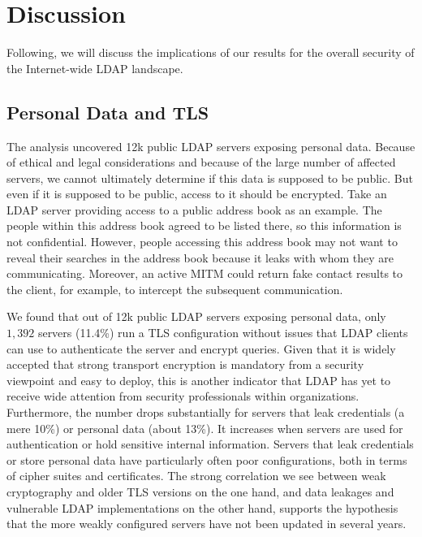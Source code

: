 \section{Discussion}
\label{sec:discussion}

Following, we will discuss the implications of our results for the overall security of the Internet-wide LDAP landscape.


\subsection{Personal Data and TLS}
The analysis uncovered 12k public LDAP servers exposing personal data. Because of ethical and legal considerations and because of the large number of affected servers, we cannot ultimately determine if this data is supposed to be public. But even if it is supposed to be public, access to it should be encrypted. Take an LDAP server providing access to a public address book as an example. The people within this address book agreed to be listed there, so this information is not confidential. However, people accessing this address book may not want to reveal their searches in the address book because it leaks with whom they are communicating. Moreover, an active \gls{MITM} could return fake contact results to the client, for example, to intercept the subsequent communication. 

We found that out of 12k public LDAP servers exposing personal data, only $1,392$ servers (11.4\%) run a TLS configuration without issues that LDAP clients can use to authenticate the server and encrypt queries. Given that it is widely accepted that strong transport encryption is mandatory from a security viewpoint and easy to deploy, this is another indicator that LDAP has yet to receive wide attention from security professionals within organizations. Furthermore, the number drops substantially for servers that leak credentials (a mere 10\%) or personal data (about 13\%). It increases when servers are used for authentication or hold sensitive internal information. Servers that leak credentials or store personal data have particularly often poor configurations, both in terms of cipher suites and certificates. The strong correlation we see between weak cryptography and older \acrshort{TLS} versions on the one hand, and data leakages and vulnerable \acrshort{LDAP} implementations on the other hand, supports the hypothesis that the more weakly configured servers have not been updated in several years.




